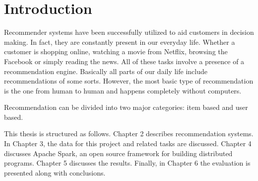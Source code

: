 \documentclass[12pt,a4paper,english
]{tutthesis}
\begin{document}
\cleardoublepage

\newpage             %
\setcounter{page}{1} %
\renewcommand{\chaptername}{} %

\chapter{Introduction}
\label{ch:intro} 

Recommender systems have been successfully utilized to aid customers in decision making.
In fact, they are constantly present in our everyday life.
Whether a customer is shopping online, watching a movie from Netflix, browsing the Facebook or simply reading the news.
All of these tasks involve a presence of a recommendation engine.
Basically all parts of our daily life include recommendations of some sorts.
However, the most basic type of recommendation is the one from human to human and happens completely without computers.

Recommendation can be divided into two major categories: item based and user based.


This thesis is structured as follows.
Chapter 2 describes recommendation systems.
In Chapter 3, the data for this project and related tasks are discussed.
Chapter 4 discusses Apache Spark, an open source framework for building distributed programs.
Chapter 5 discusses the results. Finally, in Chapter 6 the evaluation is presented along with conclusions.

\end{document}
